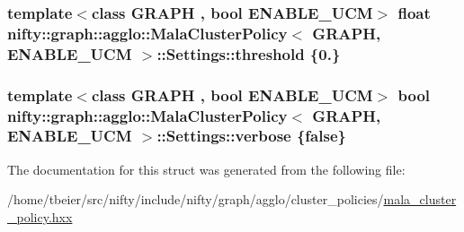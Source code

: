 \subsubsection[{threshold}]{\setlength{\rightskip}{0pt plus 5cm}template$<$class G\+R\+A\+P\+H , bool E\+N\+A\+B\+L\+E\+\_\+\+U\+C\+M$>$ float {\bf nifty\+::graph\+::agglo\+::\+Mala\+Cluster\+Policy}$<$ G\+R\+A\+P\+H, E\+N\+A\+B\+L\+E\+\_\+\+U\+C\+M $>$\+::Settings\+::threshold \{0.\}}\label{structnifty_1_1graph_1_1agglo_1_1MalaClusterPolicy_1_1Settings_a481d8fd0a487b71ad67d1ea1f1ce51a0}
\hypertarget{structnifty_1_1graph_1_1agglo_1_1MalaClusterPolicy_1_1Settings_ab892447b233b3e89473ad3fee83a305e}{}
\subsubsection[{verbose}]{\setlength{\rightskip}{0pt plus 5cm}template$<$class G\+R\+A\+P\+H , bool E\+N\+A\+B\+L\+E\+\_\+\+U\+C\+M$>$ bool {\bf nifty\+::graph\+::agglo\+::\+Mala\+Cluster\+Policy}$<$ G\+R\+A\+P\+H, E\+N\+A\+B\+L\+E\+\_\+\+U\+C\+M $>$\+::Settings\+::verbose \{false\}}\label{structnifty_1_1graph_1_1agglo_1_1MalaClusterPolicy_1_1Settings_ab892447b233b3e89473ad3fee83a305e}


The documentation for this struct was generated from the following file\+:\begin{DoxyCompactItemize}
\item 
/home/tbeier/src/nifty/include/nifty/graph/agglo/cluster\+\_\+policies/\hyperlink{mala__cluster__policy_8hxx}{mala\+\_\+cluster\+\_\+policy.\+hxx}\end{DoxyCompactItemize}
